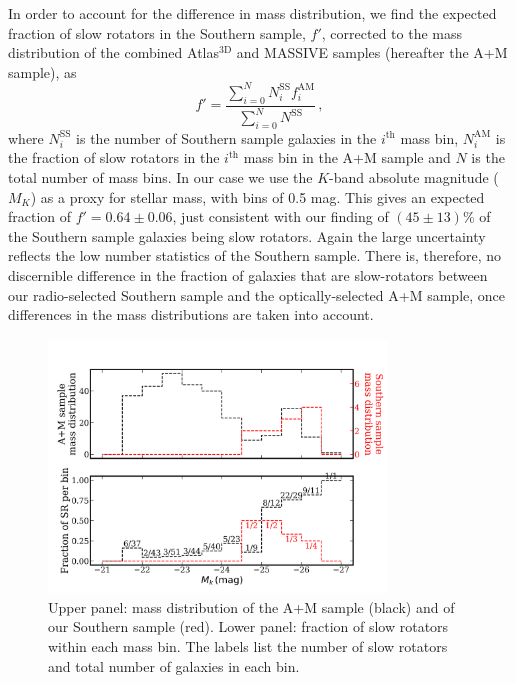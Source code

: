 		In order to account for the difference in mass distribution, we find the expected fraction of slow rotators in the Southern sample, $f'$, corrected to the mass distribution of the combined Atlas$^\text{3D}$ and MASSIVE samples (hereafter the A+M sample), as
		\begin{equation}
			f' = \frac{\sum_{i=0}^N N^\mathrm{SS}_i f^\mathrm{AM}_i}{\sum_{i=0}^N N^\mathrm{SS}} \, , 
		\end{equation}
		where $N^\mathrm{SS}_i$ is the number of Southern sample galaxies in the $i^\mathrm{th}$ mass bin, $N^\mathrm{AM}_i$ is the fraction of slow rotators in the $i^\mathrm{th}$ mass bin in the A+M sample and $N$ is the total number of mass bins. In our case we use the $K$-band absolute magnitude ($M_K$) as a proxy for stellar mass, with bins of 0.5 mag. This gives an expected fraction of $f' = 0.64 \pm 0.06$, just consistent with our finding of $(45\pm13)$\% of the Southern sample galaxies being slow rotators. Again the large uncertainty reflects the low number statistics of the Southern sample. There is, therefore, no discernible difference in the fraction of galaxies that are slow-rotators between our radio-selected Southern sample and the optically-selected A+M sample, once differences in the mass distributions are taken into account. 

		\begin{figure}
			\centering
			\includegraphics[width=0.8\textwidth]{chapter4/M_k_binned.png}
			\caption[Mass matching global kinematics]{Upper panel: mass distribution of the A+M sample (black) and of our Southern sample (red). Lower panel: fraction of slow rotators within each mass bin. The labels list the number of slow rotators and total number of galaxies in each bin.}
			\label{fig:SRmassFraction}
		\end{figure}

